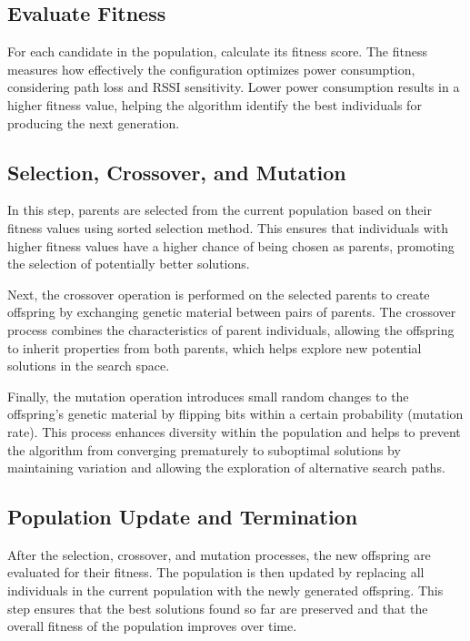 \subsection{Evaluate Fitness}

For each candidate in the population, calculate its fitness score. The fitness measures how effectively the configuration optimizes power consumption, considering path loss and RSSI sensitivity. Lower power consumption results in a higher fitness value, helping the algorithm identify the best individuals for producing the next generation.

\subsection{Selection, Crossover, and Mutation}

In this step, parents are selected from the current population based on their fitness values using sorted selection method. This ensures that individuals with higher fitness values have a higher chance of being chosen as parents, promoting the selection of potentially better solutions.

Next, the crossover operation is performed on the selected parents to create offspring by exchanging genetic material between pairs of parents. The crossover process combines the characteristics of parent individuals, allowing the offspring to inherit properties from both parents, which helps explore new potential solutions in the search space.

Finally, the mutation operation introduces small random changes to the offspring's genetic material by flipping bits within a certain probability (mutation rate). This process enhances diversity within the population and helps to prevent the algorithm from converging prematurely to suboptimal solutions by maintaining variation and allowing the exploration of alternative search paths.

\subsection{Population Update and Termination}

After the selection, crossover, and mutation processes, the new offspring are evaluated for their fitness. The population is then updated by replacing all individuals in the current population with the newly generated offspring. This step ensures that the best solutions found so far are preserved and that the overall fitness of the population improves over time.

